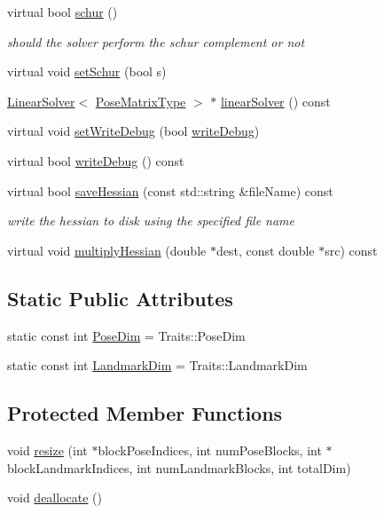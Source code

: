\begin{DoxyCompactItemize}
virtual bool \hyperlink{classg2o_1_1BlockSolver_a382173946f1dd929a625e3708c959883}{schur} ()
\begin{DoxyCompactList}\small\item\em should the solver perform the schur complement or not \end{DoxyCompactList}\item 
virtual void \hyperlink{classg2o_1_1BlockSolver_a6dd8e7e7a099410005cb96ff874d8866}{set\+Schur} (bool s)
\item 
\hyperlink{classg2o_1_1LinearSolver}{Linear\+Solver}$<$ \hyperlink{classg2o_1_1BlockSolver_a8c7c43d361bd31e3e0353889ba703bc0}{Pose\+Matrix\+Type} $>$ $\ast$ \hyperlink{classg2o_1_1BlockSolver_adb09637f5f87327d26928f672d6caadf}{linear\+Solver} () const 
\item 
virtual void \hyperlink{classg2o_1_1BlockSolver_a1bff5dc13e3408fa76c019347104acd0}{set\+Write\+Debug} (bool \hyperlink{classg2o_1_1BlockSolver_a5a127b36e9f6ec45b2b1d39c22a9901f}{write\+Debug})
\item 
virtual bool \hyperlink{classg2o_1_1BlockSolver_a5a127b36e9f6ec45b2b1d39c22a9901f}{write\+Debug} () const 
\item 
virtual bool \hyperlink{classg2o_1_1BlockSolver_a79adbc8926b11c564bdd8cf73a55b1ef}{save\+Hessian} (const std\+::string \&file\+Name) const 
\begin{DoxyCompactList}\small\item\em write the hessian to disk using the specified file name \end{DoxyCompactList}\item 
virtual void \hyperlink{classg2o_1_1BlockSolver_a615892075357273ec8bb06e101d9155b}{multiply\+Hessian} (double $\ast$dest, const double $\ast$src) const 
\end{DoxyCompactItemize}
\subsection*{Static Public Attributes}
\begin{DoxyCompactItemize}
\item 
static const int \hyperlink{classg2o_1_1BlockSolver_a9a68f557c8e04cd76565fc45e1747e45}{Pose\+Dim} = Traits\+::\+Pose\+Dim
\item 
static const int \hyperlink{classg2o_1_1BlockSolver_a2d5e499f65a71985a8256e98c1608dd9}{Landmark\+Dim} = Traits\+::\+Landmark\+Dim
\end{DoxyCompactItemize}
\subsection*{Protected Member Functions}
\begin{DoxyCompactItemize}
\item 
void \hyperlink{classg2o_1_1BlockSolver_a0075af2df18364cf99fd80f813b8ce4b}{resize} (int $\ast$block\+Pose\+Indices, int num\+Pose\+Blocks, int $\ast$block\+Landmark\+Indices, int num\+Landmark\+Blocks, int total\+Dim)
\item 
void \hyperlink{classg2o_1_1BlockSolver_a1877467844b7b9ab51bd6600e3a93eb0}{deallocate} ()
\end{DoxyCompactItemize}
